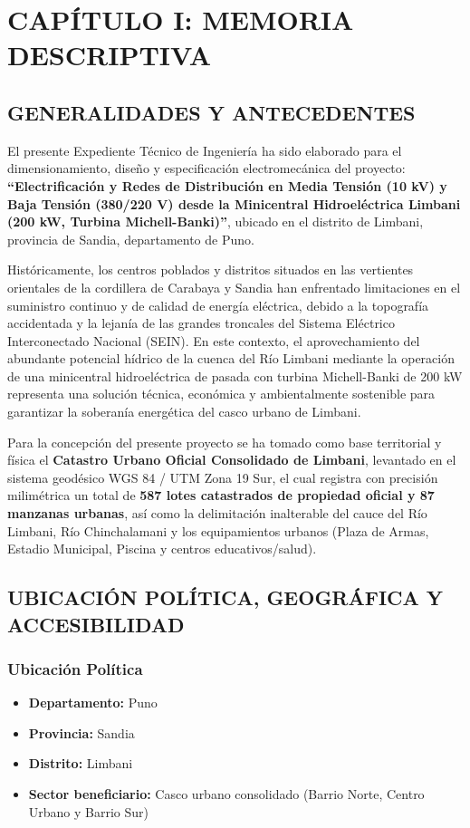 \chapter*{CAPÍTULO I: MEMORIA DESCRIPTIVA}

\section{GENERALIDADES Y ANTECEDENTES}

El presente Expediente Técnico de Ingeniería ha sido elaborado para el dimensionamiento, diseño y especificación electromecánica del proyecto: \textbf{``Electrificación y Redes de Distribución en Media Tensión (10 kV) y Baja Tensión (380/220 V) desde la Minicentral Hidroeléctrica Limbani (200 kW, Turbina Michell-Banki)''}, ubicado en el distrito de Limbani, provincia de Sandia, departamento de Puno.

Históricamente, los centros poblados y distritos situados en las vertientes orientales de la cordillera de Carabaya y Sandia han enfrentado limitaciones en el suministro continuo y de calidad de energía eléctrica, debido a la topografía accidentada y la lejanía de las grandes troncales del Sistema Eléctrico Interconectado Nacional (SEIN). En este contexto, el aprovechamiento del abundante potencial hídrico de la cuenca del Río Limbani mediante la operación de una minicentral hidroeléctrica de pasada con turbina Michell-Banki de 200 kW representa una solución técnica, económica y ambientalmente sostenible para garantizar la soberanía energética del casco urbano de Limbani.

Para la concepción del presente proyecto se ha tomado como base territorial y física el \textbf{Catastro Urbano Oficial Consolidado de Limbani}, levantado en el sistema geodésico WGS 84 / UTM Zona 19 Sur, el cual registra con precisión milimétrica un total de \textbf{587 lotes catastrados de propiedad oficial y 87 manzanas urbanas}, así como la delimitación inalterable del cauce del Río Limbani, Río Chinchalamani y los equipamientos urbanos (Plaza de Armas, Estadio Municipal, Piscina y centros educativos/salud).

\section{UBICACIÓN POLÍTICA, GEOGRÁFICA Y ACCESIBILIDAD}

\subsection{Ubicación Política}
\begin{itemize}
  \item \textbf{Departamento:} Puno
  \item \textbf{Provincia:} Sandia
  \item \textbf{Distrito:} Limbani
  \item \textbf{Sector beneficiario:} Casco urbano consolidado (Barrio Norte, Centro Urbano y Barrio Sur)
\end{itemize}

